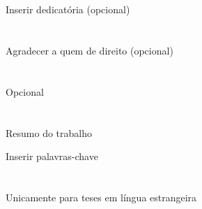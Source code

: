 \documentclass[11pt,twoside]{estiloUBI}
\begin{document}
\onehalfspacing





\pagestyle{fancy}


\cleardoublepage



\newpage 
\section*{}
\vspace{0.5cm}
Inserir dedicatória (opcional)
\cleardoublepage


\newpage 	
\section*{}
\vspace{0.5cm}
Agradecer a quem de direito (opcional)
\cleardoublepage


\newpage 	
\section*{}
\vspace{0.5cm}
Opcional
\cleardoublepage


\newpage 	
\section*{}
\vspace{0.5cm}
Resumo do trabalho
 
\vspace{2.2cm}
{}

\vspace{0.8cm}
Inserir palavras-chave
\cleardoublepage


\newpage 	
\section*{}
\vspace{0.5cm}
Unicamente para teses em língua estrangeira
\cleardoublepage
\end{document}
